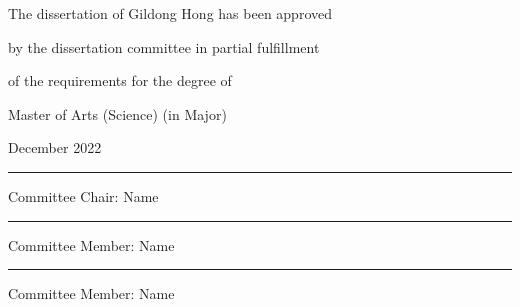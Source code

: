 \documentclass[11pt]{report}
\numberwithin{figure}{chapter}
\theoremstyle{plain}
\theoremstyle{definition}
\theoremstyle{corollary}
\theoremstyle{definition}
\theoremstyle{plain}
\theoremstyle{definition}
\theoremstyle{plain}
\begin{document}
\newpage
\begin{center}
\Large
The dissertation of Gildong Hong has been approved \par
by the dissertation committee in partial fulfillment\par
of the requirements for the degree of \par
Master of Arts (Science) (in Major) 

\par\vspace{50pt}

\large December 2022

\par\vspace{50pt}

\rule{.6\textwidth}{0.4pt}\par
Committee Chair: Name

\par\vspace{20pt}
 
\rule{.6\textwidth}{0.4pt}\par
Committee Member: Name
 
\par\vspace{20pt}

\rule{.6\textwidth}{0.4pt}\par
Committee Member: Name 
\end{center}
\end{document}
